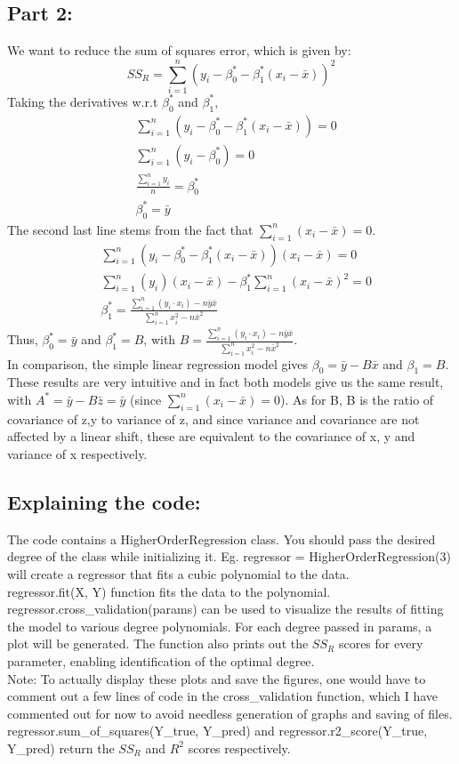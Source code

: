 \subsection{Part 2: }
We want to reduce the sum of squares error, which is given by:
\[
    SS_R = \sum_{i=1}^{n} (y_i - \beta_0^* - \beta_1^* (x_i-\bar{x}))^2
\]  
Taking the derivatives w.r.t $\beta_0^*$ and $\beta_1^*$,
\begin{align}
    &\sum_{i=1}^n (y_i-\beta_0^*-\beta_1^*(x_i-\bar{x}))=0\\
    &\sum_{i=1}^n (y_i-\beta_0^*)=0\\
    &\frac{\sum_{i=1}^n y_i}{n}=\beta_0^*\\
    &\beta_0^*=\bar{y}
\end{align}
The second last line stems from the fact that $\sum_{i=1}^n(x_i-\bar{x})=0$.
\begin{align}
    &\sum_{i=1}^n (y_i-\beta_0^*-\beta_1^*(x_i-\bar{x}))(x_i-\bar{x})=0\\
    &\sum_{i=1}^n (y_i)(x_i-\bar{x}) - \beta_1^*\sum_{i=1}^n (x_i-\bar{x})^2=0\\
    &\beta_1^*=\frac{\sum_{i=1}^n (y_i\cdot x_i)-n\bar{y}\bar{x}}{\sum_{i=1}^n x_i^2 - n\bar{x}^2}
\end{align}
Thus, $\beta_0^*= \bar{y}$ and $\beta_1^* = B$, with $B=\frac{\sum_{i=1}^n (y_i\cdot x_i)-n\bar{y}\bar{x}}{\sum_{i=1}^n x_i^2 - n\bar{x}^2}$.\\
In comparison, the simple linear regression model gives $\beta_0 = \bar{y}-B\bar{x}$ and $\beta_1 = B$. These results are very intuitive and in fact both models give us the same result, with $A^*=\bar{y}-B\bar{z}=\bar{y}$ (since $\sum_{i=1}^n(x_i-\bar{x})=0$). As for B, B is the ratio of covariance of z,y to variance of z, and since variance and covariance are not affected by a linear shift, these are equivalent to the covariance of x, y and variance of x respectively.\\
\subsection{Explaining the code: }
The code contains a HigherOrderRegression class. You should pass the desired degree of the class while initializing it. Eg. regressor = HigherOrderRegression(3) will create a regressor that fits a cubic polynomial to the data.\\
regressor.fit(X, Y) function fits the data to the polynomial.\\
regressor.cross\_validation(params) can be used to visualize the results of fitting the model to various degree polynomials. For each degree passed in params, a plot will be generated. The function also prints out the $SS_R$ scores for every parameter, enabling identification of the optimal degree.\\
Note: To actually display these plots and save the figures, one would have to comment out a few lines of code in the cross\_validation function, which I have commented out for now to avoid needless generation of graphs and saving of files.\\
regressor.sum\_of\_squares(Y\_true, Y\_pred) and regressor.r2\_score(Y\_true, Y\_pred) return the $SS_R$ and $R^2$ scores respectively.\\
